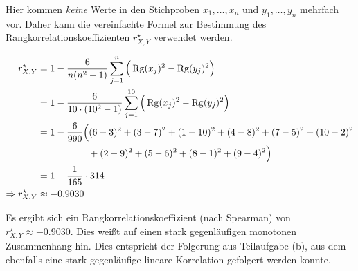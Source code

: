 Hier kommen \emph{keine} Werte in den Stichproben $x_1,\ldots,x_n$ und $y_1,\ldots,y_n$ mehrfach vor. Daher kann die vereinfachte Formel zur Bestimmung des Rangkorrelationskoeffizienten $r^\star_{X,Y}$ verwendet werden.

\vspace{-0.5cm}
\begin{align*}
    r_{X,Y}^\star &= 1- \frac{6}{n(n^2-1)} \sum_{j=1}^{n} \Big(\operatorname{Rg}(x_j)^2 - \operatorname{Rg}(y_j)^2\Big) \\
    &= 1 - \frac{6}{10\cdot(10^2-1)} \sum_{j=1}^{10} \Big(\operatorname{Rg}(x_j)^2 - \operatorname{Rg}(y_j)^2\Big) \\
    &= 1 - \frac{6}{990} \Big( (6-3)^2 + (3-7)^2 + (1-10)^2 + (4-8)^2 + (7-5)^2 + (10-2)^2 \\
    &\qquad\qquad\quad~ + (2-9)^2 + (5-6)^2 + (8-1)^2 + (9-4)^2 \Big) \\
    &= 1 - \frac{1}{165}\cdot 314 \\
    \Rightarrow r_{X,Y}^\star &\approx -0.9030
\end{align*}

Es ergibt sich ein Rangkorrelationskoeffizient (nach Spearman) von $r_{X,Y}^\star \approx -0.9030$. Dies weißt auf einen stark gegenläufigen monotonen Zusammenhang hin. Dies entspricht der Folgerung aus Teilaufgabe (b), aus dem ebenfalls eine stark gegenläufige lineare Korrelation gefolgert werden konnte.
